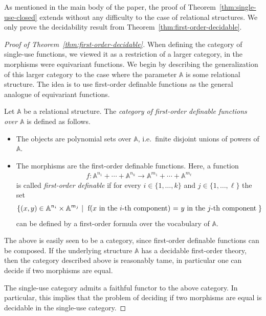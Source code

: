 \documentclass[10pt,a4paper]{amsart}
\numberwithin{equation}{section}
\theoremstyle{plain}
\newcommand{\set}[1]{\{#1\}}
\newcommand{\atoms}{\mathbb A}
\newcommand{\setbuild}[2]{\set{#1 \ | 
\begin{tabular}{l}
	#2
\end{tabular}\!\!} }
\begin{document}
As mentioned in the main body of the paper, the proof of Theorem~\ref{thm:single-use-closed} extends without any difficulty to the case of relational structures. We only prove the decidability result from Theorem~\ref{thm:first-order-decidable}.


\begin{proof}[Proof of Theorem~\ref{thm:first-order-decidable}]
    When defining the category of single-use functions, we viewed it as a restriction of a larger category, in the morphisms were equivariant functions.  We begin by describing the generalization of this larger category to the case where the parameter $\atoms$ is some relational structure. The idea is to use first-order definable functions as the general analogue of equivariant functions. 

\begin{definition}
    Let $\atoms$ be a relational structure. The \emph{category of first-order definable functions over $\atoms$} is defined as follows.
    \begin{itemize}
        \item The objects are polynomial sets over $\atoms$, i.e.~finite disjoint unions of powers of $\atoms$.
        \item The morphisms are the  first-order definable functions. Here, a function 
        \begin{align*}
            f : \atoms^{n_1} + \cdots + \atoms^{n_k} \to \atoms^{m_1} + \cdots + \atoms^{m_\ell}
            \end{align*}
            is called  \emph{first-order definable} if for every $i \in \set{1,\ldots,k}$ and  $j \in \set{1,\ldots,\ell}$ the set 
            \begin{align*}
            \setbuild{ (x,y) \in \atoms^{n_i} \times \atoms^{m_j}}{f(\text{$x$ in the $i$-th component}) = \text{$y$ in the $j$-th component}}
            \end{align*}
            can be defined by a first-order formula over the vocabulary of $\atoms$.
    \end{itemize}
\end{definition}
The above is easily seen to be a category, since first-order definable functions  can be composed. 
If the underlying structure $\atoms$ has a decidable first-order theory, then the category described above is reasonably tame, in particular one can decide if two morphisms are equal.

The single-use category admits a faithful functor to the above category. In particular, this implies that the problem of deciding if two morphisms are equal is decidable in the single-use category. 
\end{proof}
\end{document}
